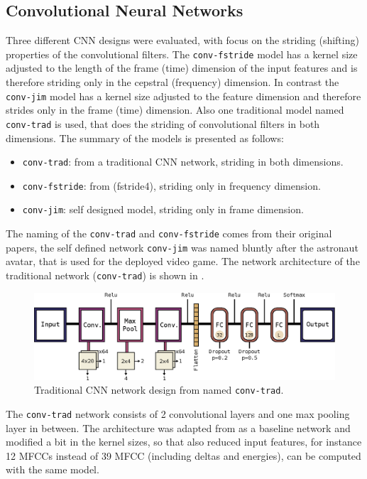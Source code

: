 \subsection{Convolutional Neural Networks}\label{sec:nn_arch_cnn}
Three different CNN designs were evaluated, with focus on the striding (shifting) properties of the convolutional filters.
The \texttt{conv-fstride} model has a kernel size adjusted to the length of the frame (time) dimension of the input features and is therefore striding only in the cepstral (frequency) dimension.
In contrast the \texttt{conv-jim} model has a kernel size adjusted to the feature dimension and therefore strides only in the frame (time) dimension.
Also one traditional model named \texttt{conv-trad} is used, that does the striding of convolutional filters in both dimensions.
The summary of the models is presented as follows:
\begin{itemize}
	\item \texttt{conv-trad}: from \cite{Sainath2015} a traditional CNN network, striding in both dimensions.
	\item \texttt{conv-fstride}: from \cite{Sainath2015} (fstride4), striding only in frequency dimension.
	\item \texttt{conv-jim}: self designed model, striding only in frame dimension.
\end{itemize}
The naming of the \texttt{conv-trad} and \texttt{conv-fstride} comes from their original papers, the self defined network \texttt{conv-jim} was named bluntly after the astronaut avatar, that is used for the deployed video game.
The network architecture of the traditional network (\texttt{conv-trad}) is shown in .
\begin{figure}[!ht]
  \centering
    \includegraphics[height=0.2\textwidth]{./4_nn/figs/nn_arch_cnn_trad.eps}
  \caption{Traditional CNN network design from \cite{Sainath2015} named \texttt{conv-trad}.}
  \label{fig:nn_arch_cnn_trad}
\end{figure}
\FloatBarrier
\noindent
The \texttt{conv-trad} network consists of 2 convolutional layers and one max pooling layer in between.
The architecture was adapted from \cite{Sainath2015} as a baseline network and modified a bit in the kernel sizes, so that also reduced input features, for instance 12 MFCCs instead of 39 MFCC (including deltas and energies), can be computed with the same model.
